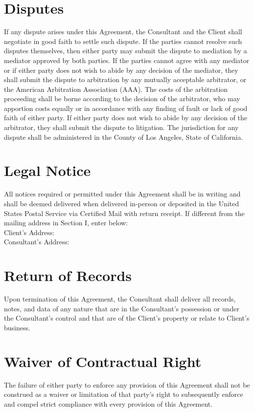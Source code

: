 \documentclass{article}
\begin{document}
\section{Disputes}
If any dispute arises under this Agreement, the Consultant and the Client shall negotiate in good faith to settle such dispute. If the parties cannot resolve such disputes themselves, then either party may submit the dispute to mediation by a mediator approved by both parties. If the parties cannot agree with any mediator or if either party does not wish to abide by any decision of the mediator, they shall submit the dispute to arbitration by any mutually acceptable arbitrator, or the American Arbitration Association (AAA). The costs of the arbitration proceeding shall be borne according to the decision of the arbitrator, who may apportion costs equally or in accordance with any finding of fault or lack of good faith of either party. If either party does not wish to abide by any decision of the arbitrator, they shall submit the dispute to litigation. The jurisdiction for any dispute shall be administered in the County of Los Angeles, State of California.

\section{Legal Notice}
All notices required or permitted under this Agreement shall be in writing and shall be deemed delivered when delivered in-person or deposited in the United States Postal Service via Certified Mail with return receipt. If different from the mailing address in Section I, enter below: \\
Client's Address: \clientaddralt \\
Consultant's Address: \consultantaddralt

\section{Return of Records}
Upon termination of this Agreement, the Consultant shall deliver all records, notes, and data of any nature that are in the Consultant's possession or under the Consultant's control and that are of the Client's property or relate to Client's business.

\section{Waiver of Contractual Right}
The failure of either party to enforce any provision of this Agreement shall not be construed as a waiver or limitation of that party's right to subsequently enforce and compel strict compliance with every provision of this Agreement.
\end{document}
